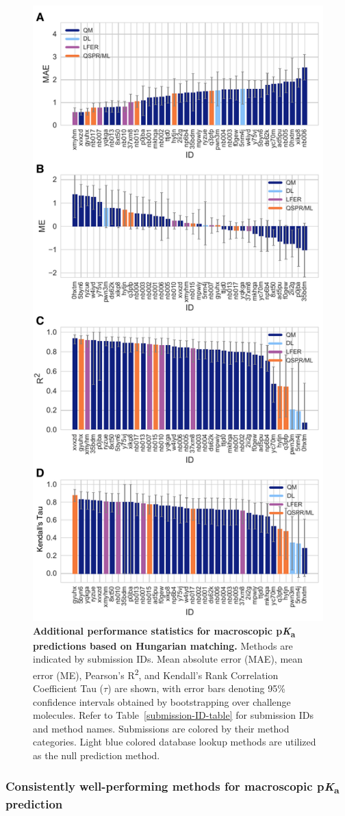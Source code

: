 \documentclass[9pt,lineno,final]{elife}
\newcommand{\pKa}{p\textit{K}\textsubscript{a}}
\begin{document}
\begin{figure}[ht!]
\centering
\includegraphics[width=0.5\linewidth]{figures/typeIII_statistics.pdf}
\caption{{\bf Additional performance statistics for macroscopic \pKa{} predictions based on Hungarian matching.} 
Methods are indicated by submission IDs. 
Mean absolute error (MAE), mean error (ME), Pearson’s R\textsuperscript{2}, and Kendall’s Rank Correlation Coefficient Tau ($\tau$) are shown, with error bars denoting 95\% confidence intervals obtained by bootstrapping over challenge molecules. 
Refer to Table~\ref{submission-ID-table} for submission IDs and method names. 
Submissions are colored by their method categories. 
Light blue colored database lookup methods are utilized as the null prediction method.
}
\label{fig:typeIII-statistics}
\end{figure}


\subsubsection{Consistently well-performing methods for macroscopic \pKa{} prediction}
\end{document}
